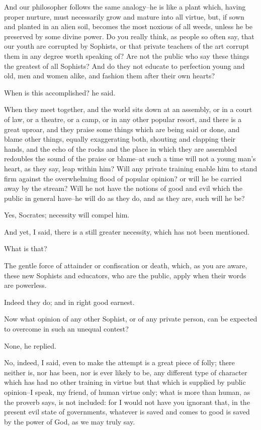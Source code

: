 And our philosopher follows the same analogy--he is like a plant which,
having proper nurture, must necessarily grow and mature into all virtue,
but, if sown and planted in an alien soil, becomes the most noxious of
all weeds, unless he be preserved by some divine power. Do you really
think, as people so often say, that our youth are corrupted by Sophists,
or that private teachers of the art corrupt them in any degree worth
speaking of? Are not the public who say these things the greatest of all
Sophists? And do they not educate to perfection young and old, men and
women alike, and fashion them after their own hearts?

When is this accomplished? he said.

When they meet together, and the world sits down at an assembly, or in
a court of law, or a theatre, or a camp, or in any other popular resort,
and there is a great uproar, and they praise some things which are
being said or done, and blame other things, equally exaggerating both,
shouting and clapping their hands, and the echo of the rocks and the
place in which they are assembled redoubles the sound of the praise or
blame--at such a time will not a young man's heart, as they say, leap
within him? Will any private training enable him to stand firm against
the overwhelming flood of popular opinion? or will he be carried away
by the stream? Will he not have the notions of good and evil which the
public in general have--he will do as they do, and as they are, such
will he be?

Yes, Socrates; necessity will compel him.

And yet, I said, there is a still greater necessity, which has not been
mentioned.

What is that?

The gentle force of attainder or confiscation or death, which, as you
are aware, these new Sophists and educators, who are the public, apply
when their words are powerless.

Indeed they do; and in right good earnest.

Now what opinion of any other Sophist, or of any private person, can be
expected to overcome in such an unequal contest?

None, he replied.

No, indeed, I said, even to make the attempt is a great piece of folly;
there neither is, nor has been, nor is ever likely to be, any different
type of character which has had no other training in virtue but that
which is supplied by public opinion--I speak, my friend, of human virtue
only; what is more than human, as the proverb says, is not included:
for I would not have you ignorant that, in the present evil state of
governments, whatever is saved and comes to good is saved by the power
of God, as we may truly say.

